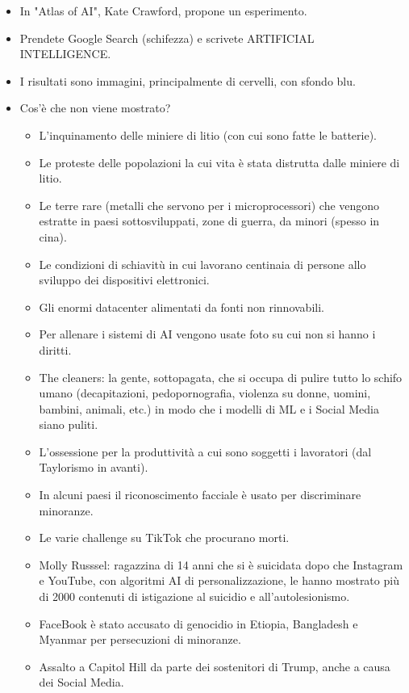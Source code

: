 \begin{itemize}
  \item In "Atlas of AI", Kate Crawford, propone un esperimento. 
  \item Prendete Google Search (schifezza) e scrivete ARTIFICIAL INTELLIGENCE. 
  \item I risultati sono immagini, principalmente di cervelli, con sfondo blu. 
  \item Cos'è che non viene mostrato? 
    \begin{itemize}
      \item L'inquinamento delle miniere di litio (con cui sono fatte le batterie). 
      \item Le proteste delle popolazioni la cui vita è stata distrutta dalle miniere di litio. 
      \item Le terre rare (metalli che servono per i microprocessori) che vengono estratte in paesi sottosviluppati, zone di guerra, da minori (spesso in cina). 
      \item Le condizioni di schiavitù in cui lavorano centinaia di persone allo sviluppo dei dispositivi elettronici.
      \item Gli enormi datacenter alimentati da fonti non rinnovabili.
      \item Per allenare i sistemi di AI vengono usate foto su cui non si hanno i diritti.
      \item The cleaners: la gente, sottopagata, che si occupa di pulire tutto lo schifo umano (decapitazioni, pedopornografia, violenza su donne, uomini, bambini, animali, etc.) in modo che i modelli di ML e i Social Media siano puliti.
      \item L'ossessione per la produttività a cui sono soggetti i lavoratori (dal Taylorismo in avanti).
      \item In alcuni paesi il riconoscimento facciale è usato per discriminare minoranze.
      \item Le varie challenge su TikTok che procurano morti. 
      \item Molly Russsel: ragazzina di 14 anni che si è suicidata dopo che Instagram e YouTube, con algoritmi AI di personalizzazione, le hanno mostrato più di 2000 contenuti di istigazione al suicidio e all'autolesionismo. 
      \item FaceBook è stato accusato di genocidio in Etiopia, Bangladesh e Myanmar per persecuzioni di minoranze. 
      \item Assalto a Capitol Hill da parte dei sostenitori di Trump, anche a causa dei Social Media. 

\end{itemize}
\end{itemize}

